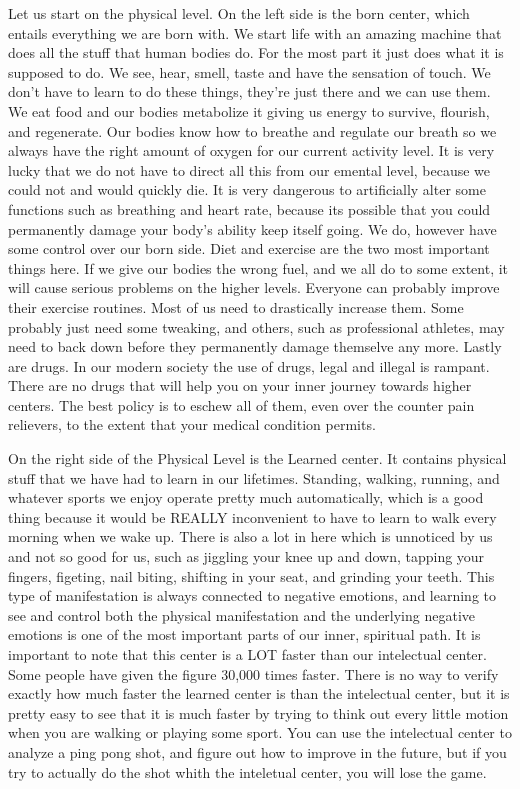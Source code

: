 \documentclass[12pt,letterpaper]{book}
\begin{document}
Let us start on the physical level. On the left side is the born center, which entails everything we are born with. We start life with an amazing machine that does all the stuff that human bodies do. For the most part it just does what it is supposed to do. We see, hear, smell, taste and have the sensation of touch. We don't have to learn to do these things, they're just there and we can use them. We eat food and our bodies metabolize it giving us energy to survive, flourish, and regenerate. Our bodies know how to breathe and regulate our breath so we always have the right amount of oxygen for our current activity level. It is very lucky that we do not have to direct all this from our emental level, because we could not and would quickly die. It is very dangerous to artificially alter some functions such as breathing and heart rate, because its possible that you could permanently damage your body's ability keep itself going. We do, however have some control over our born side. Diet and exercise are the two most important things here. If we give our bodies the wrong fuel, and we all do to some extent, it will cause serious problems on the higher levels. Everyone can probably improve their exercise routines. Most of us need to drastically increase them. Some probably just need some tweaking, and others, such as professional athletes, may need to back down before they permanently damage themselve any more. Lastly are drugs. In our modern society the use of drugs, legal and illegal is rampant. There are no drugs that will help you on your inner journey towards higher centers. The best policy is to eschew all of them, even over the counter pain relievers, to the extent that your medical condition permits.

On the right side of the Physical Level is the Learned center. It contains physical stuff that we have had to learn in our lifetimes. Standing, walking, running, and whatever sports we enjoy operate pretty much automatically, which is a good thing because it would be REALLY inconvenient to have to learn to walk every morning when we wake up. There is also a lot in here which is unnoticed by us and not so good for us, such as jiggling your knee up and down, tapping your fingers, figeting, nail biting, shifting in your seat, and grinding your teeth. This type of manifestation is always connected to negative emotions, and learning to see and control both the physical manifestation and the underlying negative emotions is one of the most important parts of our inner, spiritual path. It is important to note that this center is a LOT faster than our intelectual center. Some people have given the figure 30,000 times faster. There is no way to verify exactly how much faster the learned center is than the intelectual center, but it is pretty easy to see that it is much faster by trying to think out every little motion when you are walking or playing some sport. You can use the intelectual center to analyze a ping pong shot, and figure out how to improve in the future, but if you try to actually do the shot whith the inteletual center, you will lose the game. 
\end{document}
